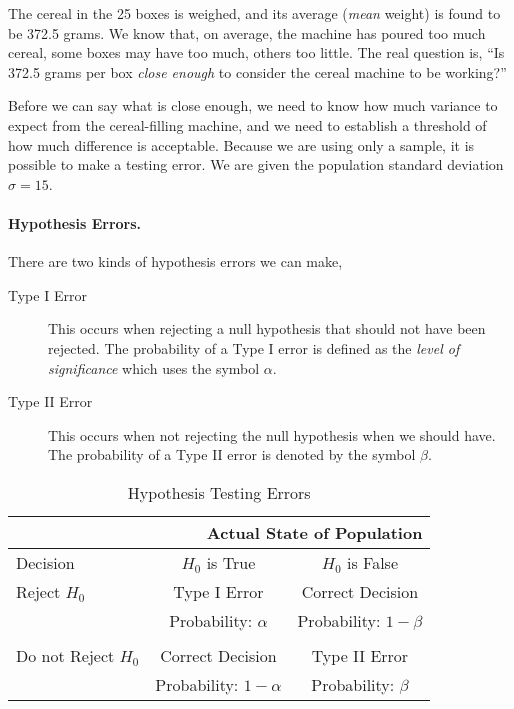 The cereal in the 25 boxes is weighed, and its average (\emph{mean} weight) is found to be 372.5 grams. We know that, on average, the machine has poured too much cereal, some boxes may have too much, others too little. The real question is, ``Is 372.5 grams per box \emph{close enough} to consider the cereal machine to be working?''

Before we can say what is close enough, we need to know how much variance to expect from the cereal-filling machine, and we need to establish a threshold of how much difference is acceptable. Because we are using only a sample, it is possible to make a testing error. We are given the population standard deviation $\sigma=15$.

\paragraph{Hypothesis Errors.}There are two kinds of hypothesis errors we can make,
\begin{description}
\item[Type I Error] This occurs when rejecting a null hypothesis that should not have been rejected. The probability of a Type I error is defined as the \emph{level of significance} which uses the symbol $\alpha$.
\item[Type II Error] This occurs when not rejecting the null hypothesis when we should have. The probability of a Type II error is denoted by the symbol $\beta$.
\end{description}

\begin{table}[htbp]
   \centering
   \begin{tabular}{@{} lcc @{}}
      \toprule %
      \multicolumn{3}{r}{Actual State of Population} \\
      \hline
       Decision    & $H_0$ is True & $H_0$ is False\\
      \hline
      Reject $H_0$  & Type I Error & Correct Decision \\
      & Probability: $\alpha$ & Probability: $1- \beta$  \\
      \\
      Do not Reject $H_0$   & Correct Decision  & Type II Error \\
      & Probability: $1-\alpha$ & Probability: $\beta$  \\
      \bottomrule %
   \end{tabular}
   \caption{Hypothesis Testing Errors}
   \label{tab:hyp-test-err}
\end{table}

